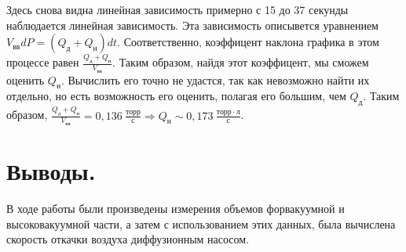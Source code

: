 \documentclass[a4paper,11pt]{article}
\begin{document}
Здесь снова видна линейная зависимость примерно с 15 до 37 секунды наблюдается линейная зависимость. Эта зависимость описывется уравнением $V_{вв} dP = (Q_{д} + Q_{н})dt$. Соответственно, коэффицент наклона графика в этом процессе равен $\frac{Q_{д}+Q_{н}}{V_{вв}}$. Таким образом, найдя этот коэффицент, мы сможем оценить $Q_{н}$. Вычислить его точно не удастся, так как невозможно найти их отдельно, но есть возможность его оценить, полагая его большим, чем $Q_{д}$. Таким образом, $\frac{Q_{д}+Q_{н}}{V_{вв}} = 0,136\ \frac{торр}{с} \Rightarrow Q_{н} \sim 0,173\ \frac{торр \cdot л}{с}$.
\section{Выводы.}
В ходе работы были произведены измерения объемов форвакуумной и высоковакуумной части, а затем с использованием этих данных, была вычислена скорость откачки воздуха диффузионным насосом.
\end{document}
